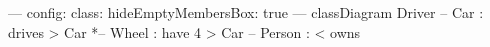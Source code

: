 \documentclass[border=4pt,varwidth=20cm]{standalone}
\begin{document}
\begin{mermaid}
---
config:
  class:
    hideEmptyMembersBox: true
---
classDiagram
  Driver -- Car : drives >
  Car *-- Wheel : have 4 >
  Car -- Person : < owns
\end{mermaid}
\end{document}
